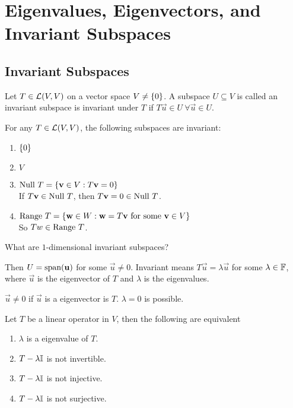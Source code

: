 \section{Eigenvalues, Eigenvectors, and
Invariant Subspaces}
\subsection{Invariant Subspaces}
\begin{definition}
    Let $T \in \mathcal L(V,V)$ on a vector space $V \neq \left\{ 0 \right\}$. A subspace $U \subseteq V$ is called an invariant subspace is invariant under $T$ if $T\vec u \in U \ \forall \vec u \in U$.
\end{definition}
\begin{example}
    For any $T \in \mathcal L(V,V)$, the following subspaces are invariant:
    \begin{enumerate}
        \item $\left\{ 0 \right\}$
        \item $V$
        \item $\text{Null } T = \left\{ \mathbf v \in V : T\mathbf v = 0 \right\}$ \\
        If $T\mathbf v \in \text{Null } T$, then $T\mathbf v = 0 \in \text{Null } T$.
        \item $\text{Range } T = \left\{ \mathbf w \in W : \mathbf w = T\mathbf v \text{ for some } \mathbf v \in V \right\}$ \\
        So $Tw \in \text{Range } T$.
    \end{enumerate}
\end{example}
\begin{question}
    What are $1$-dimensional invariant subspaces?  
\end{question}
\begin{answer}
Then $U = \text{span}(\mathbf u)$ for some $\vec u \neq 0$. Invariant means $T\vec u = \lambda \vec u$ for some $\lambda \in  \mathbb F$, where $\vec u$ is the eigenvector of $T$ and $\lambda$ is the eigenvalues.
\end{answer}
\begin{remark}
    $\vec u \neq 0$ if $\vec u$ is a eigenvector is $T$. $\lambda = 0$ is possible.
\end{remark}
\begin{proposition} Let $T$ be a linear operator in $V$, then the following are equivalent
\begin{enumerate}
    \item $\lambda$ is a eigenvalue of $T$.
    \item $T - \lambda\mathbb I$ is not invertible.
    \item $T - \lambda \mathbb I$ is not injective.
    \item $T - \lambda \mathbb I$ is not surjective.
\end{enumerate}
\end{proposition}

